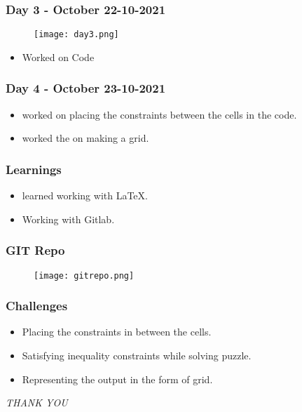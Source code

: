 \documentclass[14pt]{beamer}
\begin{document}
\begin{frame}
     \frametitle{Day 3 - October 22-10-2021}
    \begin{figure}
        \texttt{[image: day3.png]}
   \end{figure}
    \begin{itemize}
       \item Worked on Code
   \end{itemize}
\end{frame}
\begin{frame}
   \frametitle{Day 4 - October 23-10-2021}
     \begin{itemize}
         \item worked on placing the constraints between the cells in the code.
         \item worked the on making a grid.
    \end{itemize}
\end{frame}
\begin{frame}
  \frametitle{Learnings}
  \begin{itemize}
      \item learned working with LaTeX.
      \item Working with Gitlab.
   \end{itemize}
\end{frame}
\begin{frame}
	\frametitle{GIT Repo}
	 \begin{figure}
       		 \texttt{[image: gitrepo.png]}
   \end{figure}
    \end{frame}
\begin{frame}
  \frametitle{Challenges}
    \begin{itemize}
        \item Placing the constraints in between the cells.
        \item Satisfying inequality constraints while solving puzzle.
        \item Representing the output in the form of grid.
    \end{itemize}
\end{frame}
\begin{frame}
     \centering \Huge
     \emph{THANK YOU}
\end{frame}
 
\end{document}
